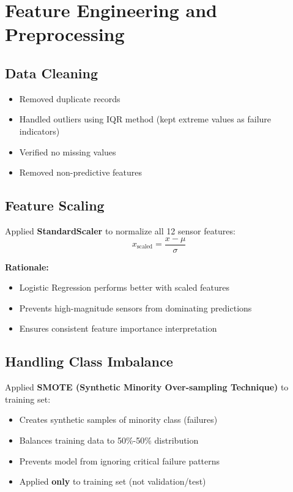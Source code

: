 \documentclass[11pt,a4paper]{article}
\begin{document}
\section{Feature Engineering and Preprocessing}

\subsection{Data Cleaning}
\begin{itemize}
    \item Removed duplicate records
    \item Handled outliers using IQR method (kept extreme values as failure indicators)
    \item Verified no missing values
    \item Removed non-predictive features
\end{itemize}

\subsection{Feature Scaling}
Applied \textbf{StandardScaler} to normalize all 12 sensor features:
\[
x_{\text{scaled}} = \frac{x - \mu}{\sigma}
\]

\textbf{Rationale:}
\begin{itemize}
    \item Logistic Regression performs better with scaled features
    \item Prevents high-magnitude sensors from dominating predictions
    \item Ensures consistent feature importance interpretation
\end{itemize}

\subsection{Handling Class Imbalance}
Applied \textbf{SMOTE (Synthetic Minority Over-sampling Technique)} to training set:
\begin{itemize}
    \item Creates synthetic samples of minority class (failures)
    \item Balances training data to 50\%-50\% distribution
    \item Prevents model from ignoring critical failure patterns
    \item Applied \textbf{only} to training set (not validation/test)
\end{itemize}
\end{document}
